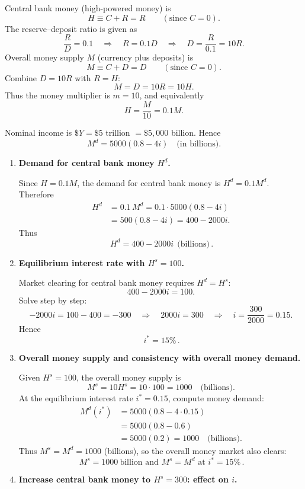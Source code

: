 \documentclass[12pt]{article}
\begin{document}
Central bank money (high-powered money) is
\[
H \equiv C+R = R \qquad (\text{since }C=0).
\]
The reserve--deposit ratio is given as
\[
\frac{R}{D}=0.1 \quad\Longrightarrow\quad R=0.1D \quad\Longrightarrow\quad D=\frac{R}{0.1}=10R.
\]
Overall money supply \(M\) (currency plus deposits) is
\[
M \equiv C + D = D \qquad (\text{since }C=0).
\]
Combine \(D=10R\) with \(R=H\):
\[
M = D = 10R = 10H.
\]
Thus the money multiplier is \(m=10\), and equivalently
\[
H = \frac{M}{10}=0.1M.
\]

Nominal income is \(\$Y=\$5\) trillion \(= \$5{,}000\) billion. Hence
\[
M^d = 5000(0.8-4i)\quad\text{(in billions).}
\]

\begin{enumerate}[label=(\alph*)]
\item \textbf{Demand for central bank money \(H^d\).}

Since \(H=0.1M\), the demand for central bank money is \(H^d=0.1M^d\). Therefore
\begin{align*}
H^d &= 0.1\,M^d
=0.1\cdot 5000(0.8-4i) \\
&= 500(0.8-4i)
= 400 - 2000i.
\end{align*}
Thus
\[
\boxed{\,H^d = 400 - 2000i\ \ \text{(billions)}\,}.
\]

\item \textbf{Equilibrium interest rate with \(H^s=100\).}

Market clearing for central bank money requires \(H^d=H^s\):
\[
400-2000i = 100.
\]
Solve step by step:
\[
-2000i = 100-400 = -300
\quad\Longrightarrow\quad
2000i = 300
\quad\Longrightarrow\quad
i = \frac{300}{2000} = 0.15.
\]
Hence
\[
\boxed{\,i^* = 15\%\, }.
\]

\item \textbf{Overall money supply and consistency with overall money demand.}

Given \(H^s=100\), the overall money supply is
\[
M^s = 10H^s = 10\cdot 100 = 1000 \quad\text{(billions)}.
\]
At the equilibrium interest rate \(i^*=0.15\), compute money demand:
\begin{align*}
M^d(i^*) &= 5000(0.8-4\cdot 0.15) \\
&= 5000(0.8-0.6) \\
&= 5000(0.2) = 1000 \quad\text{(billions)}.
\end{align*}
Thus \(M^s=M^d=1000\) (billions), so the overall money market also clears:
\[
\boxed{\,M^s = 1000\ \text{billion and }M^s=M^d\text{ at }i^*=15\%\, }.
\]

\item \textbf{Increase central bank money to \(H^s=300\): effect on \(i\).}


\end{enumerate}
\end{document}

